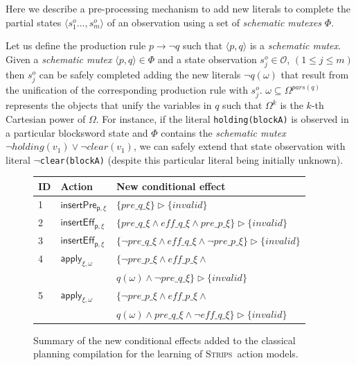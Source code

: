 \documentclass{article}
\newcommand{\tup}[1]{{\langle #1 \rangle}}
\newcommand{\strips}{\textsc{Strips}}
\begin{document}
Here we describe a pre-processing mechanism to add new literals to complete the partial states $\tup{s_1^o \ldots, s_m^o}$ of an observation using a set of {\em schematic mutexes} $\Phi$.

Let us define the production rule $p\rightarrow\neg q$ such that $\tup{p,q}$ is a {\em schematic mutex}. Given a {\em schematic mutex} $\tup{p,q}\in \Phi$ and a state observation $s_j^o\in \mathcal{O}$, {\small $(1\leq j\leq m)$} then $s_j^o$ can be safely completed adding the new literals $\neg q(\omega)$ that result from the unification of the corresponding production rule with $s_j^o$. $\omega\subseteq\Omega^{pars(q)}$ represents the objects that unify the variables in $q$ such that $\Omega^k$ is the $k$-th Cartesian power of $\Omega$. For instance, if the literal {\tt\small holding(blockA)} is observed in a particular blocksword state and $\Phi$ contains the {\em schematic mutex} $\neg holding(v_1)\vee\neg clear(v_1)$, we can safely extend that state observation with literal {\tt\small $\neg$clear(blockA)} (despite this particular literal being initially unknown).


\begin{figure}
\begin{footnotesize}
\begin{tabular}{lll}
{\bf ID} & {\bf Action} & {\bf New conditional effect}\\\hline
1&$\mathsf{insertPre_{p,\xi}}$&$\{pre\_q\_\xi\}\rhd\{invalid\}$\\
2&$\mathsf{insertEff_{p,\xi}}$&$\{pre\_q\_\xi\wedge eff\_q\_\xi\wedge pre\_p\_\xi\}\rhd\{invalid\}$\\
3&$\mathsf{insertEff_{p,\xi}}$&$\{\neg pre\_q\_\xi\wedge eff\_q\_\xi\wedge \neg pre\_p\_\xi\}\rhd\{invalid\}$\\
4&$\mathsf{apply_{\xi,\omega}}$&$\{\neg pre\_p\_\xi \wedge eff\_p\_\xi \wedge $\\
&&$q(\omega)\wedge \neg pre\_q\_\xi\}\rhd\{invalid\}$\\
5&$\mathsf{apply_{\xi,\omega}}$&$\{\neg pre\_p\_\xi \wedge eff\_p\_\xi \wedge $\\
&&$q(\omega)\wedge pre\_q\_\xi \wedge \neg eff\_q\_\xi\}\rhd\{invalid\}$
\end{tabular}
\end{footnotesize}
	\caption{\small Summary of the new conditional effects added to the classical planning compilation for the learning of \strips\ action models.}
	\label{fig:ceffects}
\end{figure}
\end{document}
